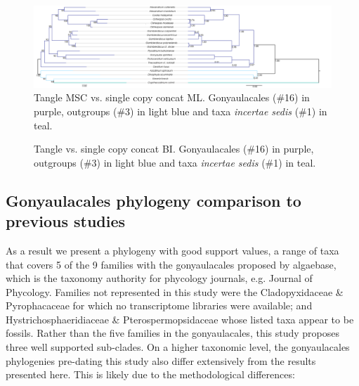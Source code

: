 \documentclass[12pt]{article}
\begin{document}
\FloatBarrier 
\begin{figure} 
\includegraphics[scale=.23]{figures/MSC-BI_vs_singlecopy-concat-ML.png} 
\caption{Tangle MSC vs. single copy concat ML. Gonyaulacales (\#16) in purple, outgroups (\#3) in light blue and taxa \textit{incertae sedis} (\#1) in teal.} 
\label{fig:tangleconcatML}
\end{figure} 
\FloatBarrier



\FloatBarrier 
\begin{figure} 
\caption{Tangle vs. single copy concat BI. Gonyaulacales (\#16) in purple, outgroups (\#3) in light blue and taxa \textit{incertae sedis} (\#1) in teal.} 
\label{fig:tangleconcatBI}
\end{figure} 
\FloatBarrier
 
\subsection*{Gonyaulacales phylogeny comparison to previous studies} 
As a result we present a phylogeny with good support values, a range of taxa that covers 5 of the 9 families with the gonyaulacales proposed by algaebase, which is the taxonomy authority for phycology journals, e.g. Journal of Phycology. 
Families not represented in this study were the Cladopyxidaceae \& Pyrophacaceae for which no transcriptome libraries were available; and Hystrichosphaeridiaceae \& Pterospermopsidaceae whose listed taxa appear to be fossils.
Rather than the five families in the gonyaulacales, this study proposes three well supported sub-clades. 
On a higher taxonomic level, the gonyaulacales phylogenies pre-dating this study also differ extensively from the results presented here. 
This is likely due to the methodological differences: 
\end{document}
